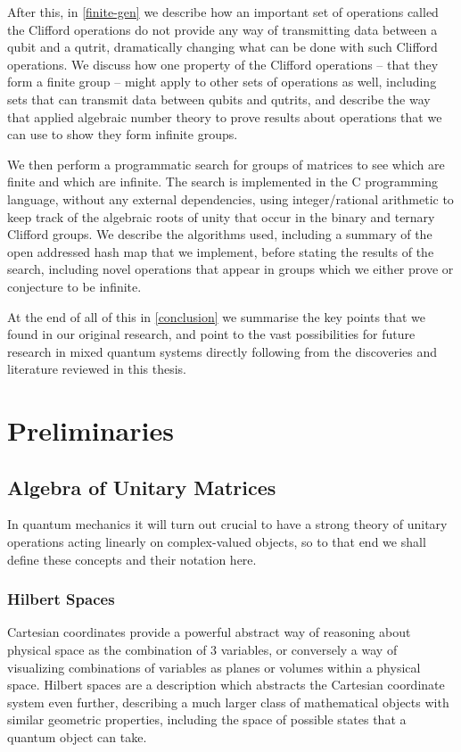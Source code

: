 After this, in \autoref{finite-gen} we describe how an important set of operations called the Clifford operations do not provide any way of transmitting data between a qubit and a qutrit, dramatically changing what can be done with such Clifford operations. We discuss how one property of the Clifford operations -- that they form a finite group -- might apply to other sets of operations as well, including sets that can transmit data between qubits and qutrits, and describe the way that \cite{universal-qubit} applied algebraic number theory to prove results about operations that we can use to show they form infinite groups.

We then perform a programmatic search for groups of matrices to see which are finite and which are infinite. The search is implemented in the C programming language, without any external dependencies, using integer/rational arithmetic to keep track of the algebraic roots of unity that occur in the binary and ternary Clifford groups. We describe the algorithms used, including a summary of the open addressed hash map that we implement, before stating the results of the search, including novel operations that appear in groups which we either prove or conjecture to be infinite.

At the end of all of this in \autoref{conclusion} we summarise the key points that we found in our original research, and point to the vast possibilities for future research in mixed quantum systems directly following from the discoveries and literature reviewed in this thesis.

\chapter[PRELIMINARIES]{Preliminaries}\label{preliminaries}
\section{Algebra of Unitary Matrices}
In quantum mechanics it will turn out crucial to have a strong theory of unitary operations acting linearly on complex-valued objects, so to that end we shall define these concepts and their notation here.
\subsection{Hilbert Spaces}\label{hilbert-space}
Cartesian coordinates provide a powerful abstract way of reasoning about physical space as the combination of 3 variables, or conversely a way of visualizing combinations of variables as planes or volumes within a physical space. Hilbert spaces are a description which abstracts the Cartesian coordinate system even further, describing a much larger class of mathematical objects with similar geometric properties, including the space of possible states that a quantum object can take.

